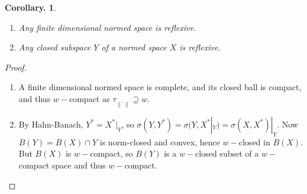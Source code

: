 \documentclass[11pt, a4paper]{memoir}
\newcommand{\norm}[1]{\ensuremath{\left\lVert#1\right\rVert}}
\theoremstyle{change}
\newtheorem{corollary}[theorem]{Corollary.}
\theoremstyle{plain}
\theoremstyle{nonumberplain}
\newtheorem{proof}{Proof}
\numberwithin{equation}{section}
\begin{document}
\begin{corollary}
    \begin{enumerate}[nl,r]
        \item Any finite dimensional normed space is reflexive.
        \item Any closed subspace $Y$ of a normed space $X$ is reflexive.
    \end{enumerate}
\end{corollary}
\begin{proof}
    \begin{enumerate}[nl,r]
        \item A finite dimensional normed space is complete, and its closed ball is compact, and thus $w-$compact as $\tau_{\norm{\cdot}}\supseteq w$.
        \item By Hahn-Banach, $Y^*=X^*|_Y$, so $\sigma(Y,Y^*)=\sigma(Y,X^*|_Y)=\sigma(X,X^*)|_Y$.
            Now $B(Y)=B(X)\cap Y$ is norm-closed and convex, hence $w-$closed in $B(X)$.
            But $B(X)$ is $w-$compact, so $B(Y)$ is a $w-$closed subset of a $w-$compact space and thus $w-$compact.
    \end{enumerate}
\end{proof}
\end{document}
